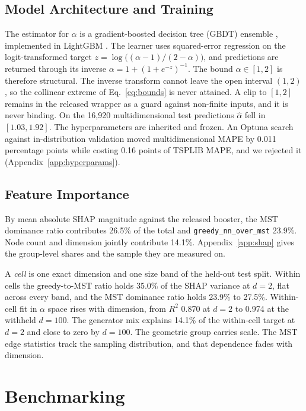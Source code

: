 \documentclass{article}
\begin{document}
\subsection{Model Architecture and Training} \label{subsec:model_training}

The estimator for $\alpha$ is a gradient-boosted decision tree (GBDT) ensemble \citep{friedman2001greedy}, implemented in LightGBM \citep{ke2017lightgbm}. The learner uses squared-error regression on the logit-transformed target $z=\log\!\big((\alpha-1)/(2-\alpha)\big)$, and predictions are returned through its inverse $\alpha=1+(1+e^{-z})^{-1}$. The bound $\alpha\in[1,2]$ is therefore structural. The inverse transform cannot leave the open interval $(1,2)$, so the collinear extreme of Eq.~\eqref{eq:bounds} is never attained. A clip to $[1,2]$ remains in the released wrapper as a guard against non-finite inputs, and it is never binding. On the 16{,}920 multidimensional test predictions $\hat\alpha$ fell in $[1.03,1.92]$. The hyperparameters are inherited and frozen. An Optuna search \citep{akiba2019optuna} against in-distribution validation moved multidimensional MAPE by 0.011 percentage points while costing 0.16 points of TSPLIB MAPE, and we rejected it (Appendix~\ref{app:hyperparams}). 


\subsection{Feature Importance}\label{subsec:shap}

By mean absolute SHAP magnitude \citep{lundberg2017shap} against the released booster, the MST dominance ratio contributes 26.5\% of the total and \texttt{greedy\_nn\_over\_mst} 23.9\%. Node count and dimension jointly contribute 14.1\%. Appendix~\ref{app:shap} gives the group-level shares and the sample they are measured on.

A \emph{cell} is one exact dimension and one size band of the held-out test split. Within cells the greedy-to-MST ratio holds 35.0\% of the SHAP variance at $d=2$, flat across every band, and the MST dominance ratio holds 23.9\% to 27.5\%. Within-cell fit in $\alpha$ space rises with dimension, from $R^2$ 0.870 at $d=2$ to 0.974 at the withheld $d=100$. The generator mix explains 14.1\% of the within-cell target at $d=2$ and close to zero by $d=100$. The geometric group carries scale. The MST edge statistics track the sampling distribution, and that dependence fades with dimension.

\section{Benchmarking} \label{sec:evaluation}
\end{document}
